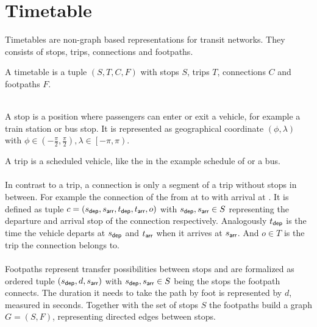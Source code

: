 \section{Timetable}\label{timetable_sec}
	Timetables  are non-graph based representations for transit networks.
	They consists of stops, trips, connections and footpaths.
	\begin{mydef}\label{timetable}
		A \textnormal{timetable} is a tuple $(S, T, C, F)$ with stops $S$, trips $T$, connections $C$ and footpaths $F$.
	\end{mydef}\quad\\
	A stop is a position where passengers can enter or exit a vehicle, for example a train station or bus stop.
	It is represented as geographical coordinate $(\phi, \lambda)$ with $\phi \in \left(-\frac{\pi}{2}, \frac{\pi}{2}\right),
	\lambda \in \left[-\pi, \pi\right)$.
	
	A trip is a scheduled vehicle, like the \ticef in the example schedule of  or a bus.\\\\
	In contrast to a trip, a connection is only a segment of a trip without stops in between. For example the connection
	of the \ticef from \freiburg at  to \offenburg with arrival at .
	It is defined as tuple $c = (s_{\textsf{dep}}, s_{\textsf{arr}}, t_{\textsf{dep}}, t_{\textsf{arr}}, o)$ with $s_{\textsf{dep}}, s_{\textsf{arr}} \in S$ representing the
	departure and arrival stop of the connection respectively. Analogously $t_{\textsf{dep}}$ is the time the vehicle departs
	at $s_{\textsf{dep}}$ and $t_{\textsf{arr}}$ when it arrives at $s_{\textsf{arr}}$. And $o \in T$ is the trip the connection belongs to.\\\\
	Footpaths represent transfer possibilities between stops and are formalized as ordered tuple $(s_{\textsf{dep}}, d, s_{\textsf{arr}})$ with
	$s_{\textsf{dep}}, s_{\textsf{arr}} \in S$ being the stops the footpath connects. The duration it needs to take the path by foot is
	represented by $d$, measured in seconds. Together with the set of stops $S$ the footpaths build a graph $G = (S, F)$,
	representing directed edges between stops.
	
